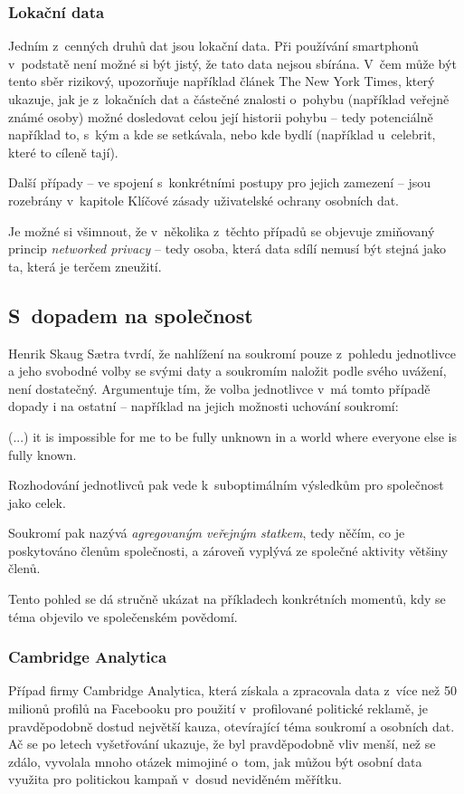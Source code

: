 \subsubsection*{Lokační data}
Jedním z~cenných druhů dat jsou lokační data. Při používání smartphonů v~podstatě není možné si být jistý, že tato data nejsou sbírána. V~čem může být tento sběr rizikový, upozorňuje například článek The New York Times\citep{location-data}, který ukazuje, jak je z~lokačních dat a částečné znalosti o~pohybu (například veřejně známé osoby) možné dosledovat celou její historii pohybu -- tedy potenciálně například to, s~kým a kde se setkávala, nebo kde bydlí (například u~celebrit, které to cíleně tají).   

Další případy -- ve spojení s~konkrétními postupy pro jejich zamezení -- jsou rozebrány v~kapitole Klíčové zásady uživatelské ochrany osobních dat.

Je možné si všimnout, že v~několika z~těchto případů se objevuje zmiňovaný princip \textit{networked privacy} -- tedy osoba, která data sdílí nemusí být stejná jako ta, která je terčem zneužití.

\subsection{S~dopadem na společnost}
Henrik Skaug Sætra tvrdí, že nahlížení na soukromí pouze z~pohledu jednotlivce a jeho svobodné volby se svými daty a soukromím naložit podle svého uvážení, není dostatečný\citep{privacy-as-aggregate-public-good}. Argumentuje tím, že volba jednotlivce v~má tomto případě dopady i na ostatní -- například na jejich možnosti uchování soukromí:

\begin{displayquote}
(...) it is impossible for me to be fully unknown in a world where everyone else is fully known.
\end{displayquote}

Rozhodování jednotlivců pak vede k~suboptimálním výsledkům pro společnost jako celek.

Soukromí pak nazývá \textit{agregovaným veřejným statkem}, tedy něčím, co je poskytováno členům společnosti, a zároveň vyplývá ze společné aktivity většiny členů.

Tento pohled se dá stručně ukázat na příkladech konkrétních momentů, kdy se téma objevilo ve společenském povědomí.

\subsubsection*{Cambridge Analytica}
Případ firmy Cambridge Analytica, která získala a zpracovala data z~více než 50 milionů profilů na Facebooku\citep{cambridge-analytica} pro použití v~profilované politické reklamě, je pravděpodobně dostud největší kauza, otevírající téma soukromí a osobních dat. Ač se po letech vyšetřování ukazuje, že byl pravděpodobně vliv menší, než se zdálo\citep{ca-brexit}\citep{ca-elections}, vyvolala mnoho otázek mimojiné o~tom, jak můžou být osobní data využita pro politickou kampaň v~dosud neviděném měřítku.

